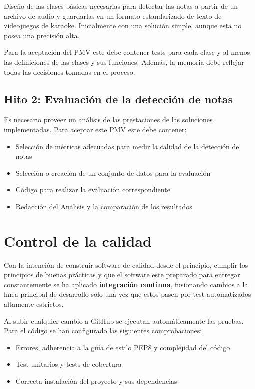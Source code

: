 Diseño de las clases básicas necesarias para detectar las notas a partir de un archivo de audio y guardarlas en un formato estandarizado de texto de videojuegos de karaoke. Inicialmente con una solución simple, aunque esta no posea una precisión alta.

Para la aceptación del PMV este debe contener tests para cada clase y al menos las definiciones de las clases y sus funciones. Además, la memoria debe reflejar todas las decisiones tomadas en el proceso.

\subsection*{Hito 2: Evaluación de la detección de notas}

Es necesario proveer un análisis de las prestaciones de las soluciones implementadas. Para aceptar este PMV este debe contener:
\begin{itemize}
	\item{Selección de métricas adecuadas para medir la calidad de la detección de notas}
	\item{Selección o creación de un conjunto de datos para la evaluación}
	\item{Código para realizar la evaluación correspondiente}
	\item{Redacción del Análisis y la comparación de los resultados}
\end{itemize}

\section{Control de la calidad}

Con la intención de construir software de calidad desde el principio, cumplir los principios de buenas prácticas y que el software este preparado para entregar constantemente se ha aplicado \textbf{integración continua}, fusionando cambios a la línea principal de desarrollo solo una vez que estos pasen por test automatizados altamente estrictos.

Al subir cualquier cambio a GitHub se ejecutan automáticamente las pruebas. Para el código se han configurado las siguientes comprobaciones:

\begin{itemize}
	\item{Errores, adherencia a la guía de estilo \href{https://peps.python.org/pep-0008/}{PEP8} y complejidad del código.}
	\item{Test unitarios y tests de cobertura}
	\item{Correcta instalación del proyecto y sus dependencias}
\end{itemize}

